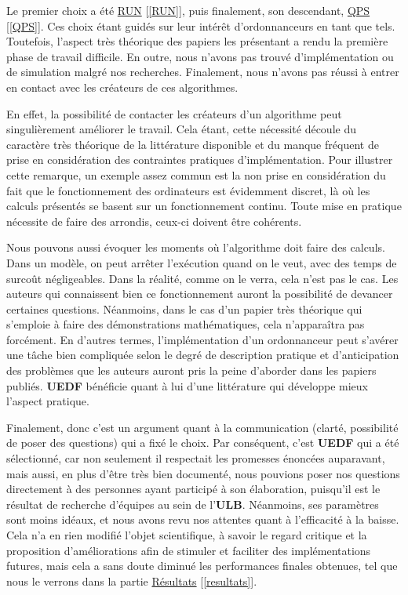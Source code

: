 	Le premier choix a été \hyperref[RUN]{RUN} [\ref*{RUN}], puis finalement, son descendant, \hyperref[QPS]{QPS} [\ref*{QPS}]. Ces choix étant guidés 
	sur leur intérêt d'ordonnanceurs en tant que tels.
	Toutefois, l'aspect très théorique des papiers les présentant a rendu la première phase de travail difficile. 
	En outre, nous n'avons pas trouvé d'implémentation ou de simulation malgré nos recherches.
	Finalement, nous n'avons pas réussi à entrer en contact avec les créateurs de ces algorithmes. \newline
	
	En effet, la possibilité de contacter les créateurs d'un algorithme peut singulièrement améliorer le 
	travail. Cela étant, cette nécessité découle du caractère très théorique de la littérature disponible
	et du manque fréquent de prise en considération des contraintes pratiques d'implémentation. 
	Pour illustrer cette remarque, un exemple assez commun est la non prise en considération 
	du fait que le fonctionnement des ordinateurs est évidemment discret, là où les 
	calculs présentés se basent sur un fonctionnement continu.
	Toute mise en pratique nécessite de faire des arrondis, ceux-ci doivent être cohérents.\newline
	
	Nous pouvons aussi évoquer les moments où l'algorithme doit faire des calculs. 
	Dans un modèle, on peut arrêter l'exécution quand on le veut, 
	avec des temps de surcoût négligeables. 	
	Dans la réalité, comme on le verra, cela 
	n'est pas le cas. 
	Les auteurs qui connaissent bien ce fonctionnement auront la possibilité de devancer certaines questions.
	Néanmoins, dans le cas d'un papier très théorique qui s'emploie à faire des démonstrations mathématiques, 
	cela n'apparaîtra pas forcément. \newline
	En d'autres termes, l'implémentation d'un ordonnanceur peut s'avérer une tâche bien compliquée selon le degré de 
	description pratique et d'anticipation des problèmes que les auteurs auront pris la peine d'aborder 
	dans les papiers publiés.
	\textbf{UEDF} bénéficie quant à lui d'une littérature qui développe mieux l'aspect pratique.\newline
	
	Finalement, donc c'est un argument quant à la communication (clarté, possibilité de poser des questions) 
	qui a fixé le choix. Par conséquent, c'est \textbf{UEDF} qui a été sélectionné, car 
	non seulement il respectait 
	les promesses énoncées auparavant, mais aussi, en plus d'être très bien documenté, 
	nous pouvions poser nos questions directement à des personnes ayant participé à son élaboration, 
	puisqu'il est le résultat de recherche d'équipes au sein de l'\textbf{ULB}. 
	Néanmoins, ses paramètres sont moins idéaux, et nous avons revu nos attentes quant à l'efficacité à la baisse. Cela n'a en rien 
	modifié l'objet scientifique, à savoir le regard critique et la proposition d'améliorations 
	afin de stimuler et faciliter des implémentations futures, mais cela a sans doute 
	diminué les performances finales obtenues, tel que nous le verrons dans la partie \hyperref[resultats]{Résultats} [\ref*{resultats}].\newline
	

